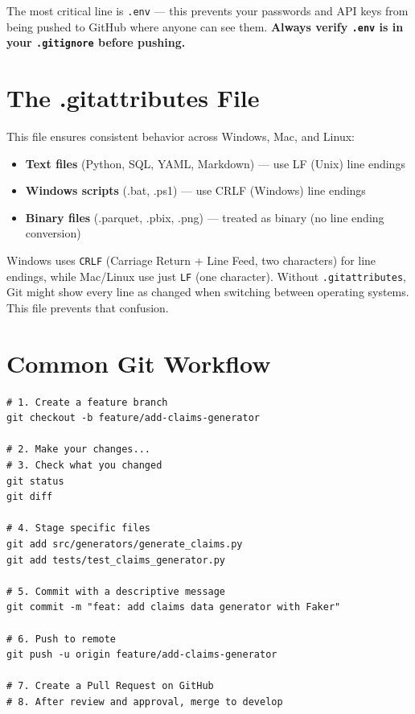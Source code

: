 \documentclass[12pt, a4paper, oneside]{report}
\begin{document}
\begin{importantbox}
    The most critical line is \texttt{.env} --- this prevents your passwords and API keys from being pushed to GitHub where anyone can see them. \textbf{Always verify \texttt{.env} is in your \texttt{.gitignore} before pushing.}
\end{importantbox}

\section{The .gitattributes File}

This file ensures consistent behavior across Windows, Mac, and Linux:

\begin{itemize}
    \item \textbf{Text files} (Python, SQL, YAML, Markdown) --- use LF (Unix) line endings
    \item \textbf{Windows scripts} (.bat, .ps1) --- use CRLF (Windows) line endings
    \item \textbf{Binary files} (.parquet, .pbix, .png) --- treated as binary (no line ending conversion)
\end{itemize}

\begin{tipbox}
    Windows uses \texttt{CRLF} (Carriage Return + Line Feed, two characters) for line endings, while Mac/Linux use just \texttt{LF} (one character). Without \texttt{.gitattributes}, Git might show every line as changed when switching between operating systems. This file prevents that confusion.
\end{tipbox}

\section{Common Git Workflow}

\begin{lstlisting}[style=bashstyle, caption={Daily Git workflow}]
# 1. Create a feature branch
git checkout -b feature/add-claims-generator

# 2. Make your changes...
# 3. Check what you changed
git status
git diff

# 4. Stage specific files
git add src/generators/generate_claims.py
git add tests/test_claims_generator.py

# 5. Commit with a descriptive message
git commit -m "feat: add claims data generator with Faker"

# 6. Push to remote
git push -u origin feature/add-claims-generator

# 7. Create a Pull Request on GitHub
# 8. After review and approval, merge to develop
\end{lstlisting}
\end{document}
